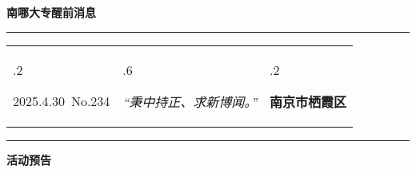 \documentclass[letterpaper, 12pt]{article}
\begin{document}
\begin{center}
    \Huge\textbf{南哪大专醒前消息}
\end{center}
\vspace{4mm}
\hrule
\renewcommand\tabularxcolumn[1]{m{#1}}
\begin{tabularx}{\textwidth}{>{\hsize.2\hsize}X>{\hsize.6\hsize}X>{\hsize.2\hsize}X}
    \begin{flushleft}
        2025.4.30\, No.234
    \end{flushleft}
    &
    \begin{center}
        \textit{“秉中持正、求新博闻。”}
    \end{center}
    &
    \begin{flushright}
        \textbf{南京市栖霞区}
    \end{flushright}
\end{tabularx}
\vspace{-3.5mm}
\hrule
\vspace{4mm}
\centerline{\huge\textbf{活动预告}}
\end{document}

